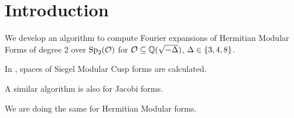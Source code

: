 
\section{Introduction}

We develop an algorithm to compute Fourier expansions of Hermitian Modular Forms of degree 2 over $\operatorname{Sp}_2(\mathcal{O})$ for $\mathcal{O} \subseteq \mathbb{Q}(\sqrt{-\Delta})$, $\Delta \in \Set{3,4,8}$.

In \cite{PoorYuen07Comp}, spaces of Siegel Modular Cusp forms are calculated.

A similar algorithm is also \cite[Algorithm 4.3]{Raum12Jacobi} for Jacobi forms.

We are doing the same for Hermitian Modular forms.
